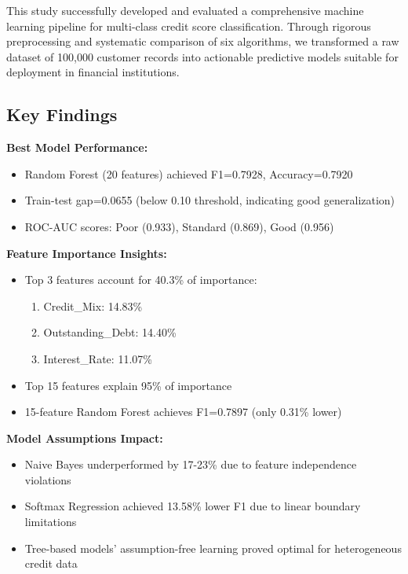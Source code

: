 \documentclass[11pt, a4paper]{article}
\begin{document}
This study successfully developed and evaluated a comprehensive machine learning pipeline for multi-class credit score classification. Through rigorous preprocessing and systematic comparison of six algorithms, we transformed a raw dataset of 100,000 customer records into actionable predictive models suitable for deployment in financial institutions.

\subsection{Key Findings}

\textbf{Best Model Performance:}
\begin{itemize}
    \item Random Forest (20 features) achieved F1=0.7928, Accuracy=0.7920
    \item Train-test gap=0.0655 (below 0.10 threshold, indicating good generalization)
    \item ROC-AUC scores: Poor (0.933), Standard (0.869), Good (0.956)
\end{itemize}

\textbf{Feature Importance Insights:}
\begin{itemize}
    \item Top 3 features account for 40.3\% of importance:
    \begin{enumerate}
        \item Credit\_Mix: 14.83\%
        \item Outstanding\_Debt: 14.40\%
        \item Interest\_Rate: 11.07\%
    \end{enumerate}
    \item Top 15 features explain 95\% of importance
    \item 15-feature Random Forest achieves F1=0.7897 (only 0.31\% lower)
\end{itemize}

\textbf{Model Assumptions Impact:}
\begin{itemize}
    \item Naive Bayes underperformed by 17-23\% due to feature independence violations
    \item Softmax Regression achieved 13.58\% lower F1 due to linear boundary limitations
    \item Tree-based models' assumption-free learning proved optimal for heterogeneous credit data
\end{itemize}
\end{document}
